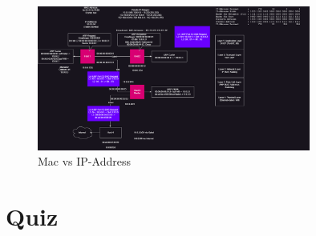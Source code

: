 \documentclass{article}
\begin{document}
\begin{figure}[h]
    \centering
    \includegraphics[width=0.8\textwidth]{assets/MAC_vs_IP-ARP+Routing.drawio.png}
    \caption{Mac vs IP-Address}
\end{figure}

\section{Quiz}
\end{document}
